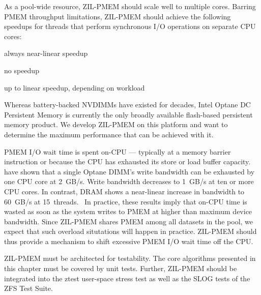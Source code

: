 \documentclass[12pt,a4paper,twoside,draft]{book}
\begin{document}
As a pool-wide resource, ZIL-PMEM should scale well to multiple cores.
Barring PMEM throughput limitations, ZIL-PMEM should achieve the following speedups for threads that perform synchronous I/O operations on separate CPU cores:
{
\setlength{\parskip}{0pt}
\begin{description}[topsep=0pt, noitemsep, leftmargin=1cm, labelindent=1cm, widest=1 private dataset per thread]
    \item[1 private dataset per thread] always near-linear speedup
    \item[1 shared dataset] \mbox{}
          \begin{description}[noitemsep, leftmargin=1cm, labelindent=1cm, widest=ZPL file system]
              \item[ZPL file system] no speedup
              \item[ZVOL] up to linear speedup, depending on workload
          \end{description}
\end{description}
}

Whereas battery-backed NVDIMMs have existed for decades, Intel Optane DC Persistent Memory is currently the only broadly available flash-based persistent memory product.
We develop ZIL-PMEM on this platform and want to determine the maximum performance that can be achieved with it.

PMEM I/O wait time is spent on-CPU --- typically at a memory barrier instruction or because the CPU has exhausted its store or load buffer capacity.
\citeauthor{yang_empirical_2020} have shown that a single Optane DIMM's write bandwidth can be exhausted by one CPU core at \SI{2}{GB/s}.
Write bandwidth decreases to \SI{1}{GB/s} at ten or more CPU cores.
In contrast, DRAM shows a near-linear increase in bandwidth to \SI{60}{GB/s} at \SI{15}{threads}.~\cite[fig.4]{yang_empirical_2020}
In practice, these results imply that on-CPU time is wasted as soon as the system writes to PMEM at higher than maximum device bandwidth.
Since ZIL-PMEM shares PMEM among all datasets in the pool, we expect that such overload situtations will happen in practice.
ZIL-PMEM should thus provide a mechanism to shift excessive PMEM I/O wait time off the CPU.

ZIL-PMEM must be architected for testability.
The core algorithms presented in this chapter must be covered by unit tests.
Further, ZIL-PMEM should be integrated into the ztest user-space stress test as well as the SLOG tests of the ZFS Test Suite.
\end{document}
